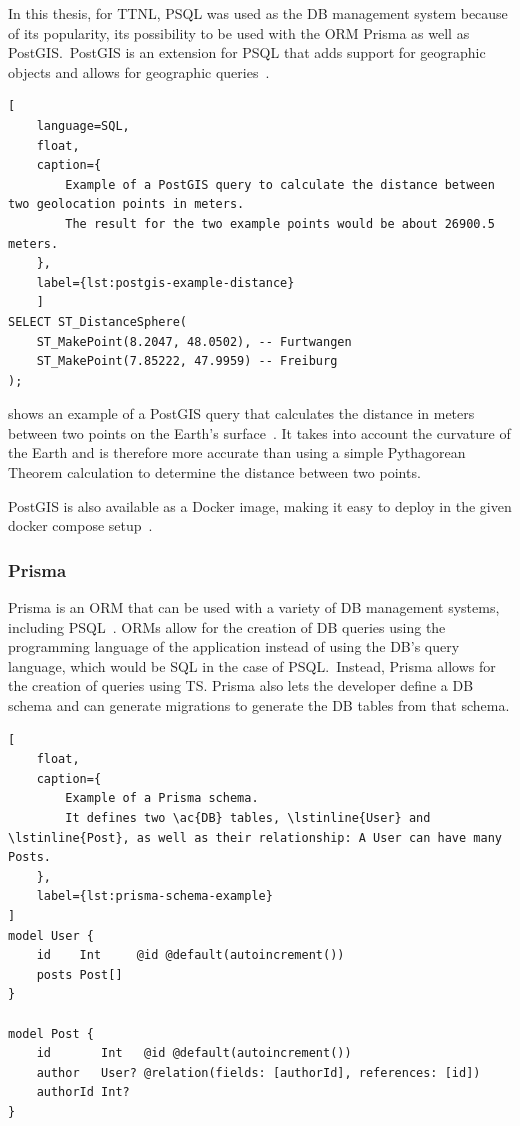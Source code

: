 In this thesis, for \ac{TTNL}, \ac{PSQL} was used as the \ac{DB} management system because of its popularity, its possibility to be used with the \ac{ORM} Prisma as well as PostGIS.\
PostGIS is an extension for \ac{PSQL} that adds support for geographic objects and allows for geographic queries~\cite{postgis_psc__osgeo_postgis_2023}.

\begin{lstlisting}[
    language=SQL,
    float,
    caption={
        Example of a PostGIS query to calculate the distance between two geolocation points in meters.
        The result for the two example points would be about 26900.5 meters.
    },
    label={lst:postgis-example-distance}
    ]
SELECT ST_DistanceSphere(
    ST_MakePoint(8.2047, 48.0502), -- Furtwangen
    ST_MakePoint(7.85222, 47.9959) -- Freiburg
);
\end{lstlisting}

 shows an example of a PostGIS query that calculates the distance in meters between two points on the Earth's surface~\cite{postgis_psc__osgeo_st_distancesphere_nodate}.
It takes into account the curvature of the Earth and is therefore more accurate than using a simple Pythagorean Theorem calculation to determine the distance between two points.

PostGIS is also available as a Docker image, making it easy to deploy in the given docker compose setup~\cite{docker_inc_postgispostgis_2023}.

\subsubsection{Prisma}

Prisma is an \ac{ORM} that can be used with a variety of \ac{DB} management systems, including \ac{PSQL}~\cite{prisma_data_inc_prisma_2023}.
\acp{ORM} allow for the creation of \ac{DB} queries using the programming language of the application instead of using the \ac{DB}'s query language, which would be \ac{SQL} in the case of \ac{PSQL}.\
Instead, Prisma allows for the creation of queries using \ac{TS}.
Prisma also lets the developer define a \ac{DB} schema and can generate migrations to generate the \ac{DB} tables from that schema.

\begin{lstlisting}[
    float,
    caption={
        Example of a Prisma schema.
        It defines two \ac{DB} tables, \lstinline{User} and \lstinline{Post}, as well as their relationship: A User can have many Posts.
    },
    label={lst:prisma-schema-example}
]
model User {
    id    Int     @id @default(autoincrement())
    posts Post[]
}
    
model Post {
    id       Int   @id @default(autoincrement())
    author   User? @relation(fields: [authorId], references: [id])
    authorId Int?
}
\end{lstlisting}

